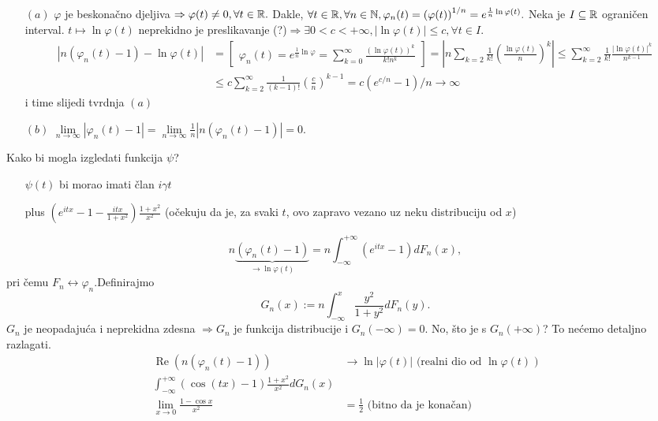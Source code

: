 \documentclass{article}
\begin{document}
\begin{enumerate}
    \item[\((a)\)] \(\varphi\) je beskonačno djeljiva \(\Rightarrow\varphi(t)\ne0,\forall t\in\Bbb R.\) Dakle, \(\forall t\in\Bbb R,\forall n\in\Bbb N,\varphi_n(t)=\left(\varphi(t)\right)^{1/n}=e^{\frac1n\ln\varphi(t)}.\) Neka je \(I\subseteq\Bbb R\) ograničen interval. \(t\mapsto\ln\varphi(t)\) neprekidno je preslikavanje (?)\(\Rightarrow\exists 0<c<+\infty,|\ln\varphi(t)|\le c,\forall t\in I.\) \[\begin{aligned}\left|n\left(\varphi_n(t)-1\right)-\ln\varphi(t)\right|&=\begin{bmatrix}\varphi_n(t)=e^{\frac1n\ln\varphi}=\sum_{k=0}^\infty\frac{(\ln\varphi(t))^k}{k!n^k}\end{bmatrix}=\left|n\sum_{k=2}\frac1{k!}\left(\frac{\ln\varphi(t)}n\right)^k\right|\le\sum_{k=2}^\infty\frac1{k!}\frac{|\ln\varphi(t)|^k}{n^{k-1}}\\&\le c\sum_{k=2}^\infty\frac1{(k-1)!}\left(\frac{c}n\right)^{k-1}=c\left(e^{c/n}-1\right)/n\to\infty\end{aligned}\] i time slijedi tvrdnja \((a)\)
    \item[\((b)\)] \(\lim\limits_{n\to\infty}|\varphi_n(t)-1|=\lim\limits_{n\to\infty}\frac1n\left|n\left(\varphi_n(t)-1\right)\right|=0.\)
\end{enumerate}
Kako bi mogla izgledati funkcija \(\psi\)?\begin{enumerate}
    \item[] \(\psi(t)\) bi morao imati član \(i\gamma t\)
    \item[] plus \(\left(e^{itx}-1-\frac{itx}{1+x^2}\right)\frac{1+x^2}{x^2}\) (očekuju da je, za svaki \(t\), ovo zapravo vezano uz neku distribuciju od \(x\))
\end{enumerate}
\[n\underbrace{\left(\varphi_n(t)-1\right)}_{\to\ln\varphi(t)}=n\int_{-\infty}^{+\infty}\left(e^{itx}-1\right)dF_n(x),\] pri čemu \(F_n\leftrightarrow\varphi_n.\)\newline Definirajmo \[G_n(x):=n\int_{-\infty}^x\frac{y^2}{1+y^2}dF_n(y).\] \(G_n\) je neopadajuća i neprekidna zdesna \(\Rightarrow G_n\) je funkcija distribucije i \(G_n(-\infty)=0.\) No, što je s \(G_n(+\infty)\)? To nećemo detaljno razlagati.
\[\begin{aligned}\operatorname{Re}\left(n\left(\varphi_n(t)-1\right)\right)&\to\ln|\varphi(t)|\text{ (realni dio od }\ln\varphi(t)\;)\\\int_{-\infty}^{+\infty}\left(\cos(tx)-1\right)\frac{1+x^2}{x^2}dG_n(x)&\\\lim_{x\to0}\frac{1-\cos x}{x^2}&=\frac12\text{ (bitno da je konačan)}\end{aligned}\]
\end{document}
